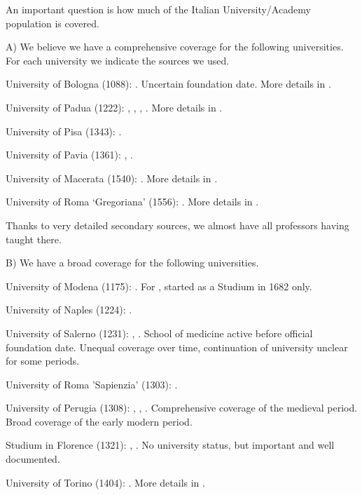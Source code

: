 An important question is how much of the Italian University/Academy population is covered. 

A) We believe we have a comprehensive coverage for the following universities. For each university we indicate the sources we used.


University of Bologna (1088): . Uncertain foundation date. More details in .

University of Padua (1222):  , , , . More details in .

University of Pisa (1343): .

University of Pavia (1361):  , .

University of Macerata (1540): . More details in .

University of Roma `Gregoriana' (1556): .  More details in .


Thanks to very detailed secondary sources, we almost have all professors having taught there.

B) We have a broad coverage for the following universities.


University of Modena (1175): . For , started as a Studium in 1682 only.

University of Naples (1224):  .

University of Salerno (1231):  , . School of medicine active before official foundation date. Unequal coverage over time, continuation of university unclear for some periods.

University of Roma 'Sapienzia' (1303): .

University of Perugia (1308): , ,  . Comprehensive coverage of the medieval period. Broad coverage of the early modern period.

Studium in Florence (1321): , . No university status, but important and well documented.

University of Torino (1404): . More details in .

